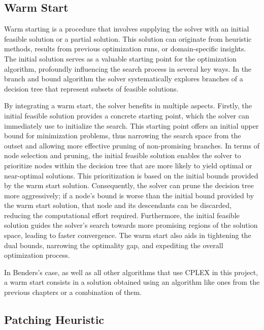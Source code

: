 \subsection{Warm Start}

Warm starting is a procedure that involves supplying the solver with an initial feasible solution or a partial solution.
This solution can originate from heuristic methods, results from previous optimization runs, or domain-specific insights.
The initial solution serves as a valuable starting point for the optimization algorithm, profoundly influencing the search process in several key ways.
In the branch and bound algorithm the solver systematically explores branches of a decision tree that represent subsets of feasible solutions.

By integrating a warm start, the solver benefits in multiple aspects. Firstly, the initial feasible solution provides a concrete starting point, which the solver can immediately use to initialize the search.
This starting point offers an initial upper bound for minimization problems, thus narrowing the search space from the outset and allowing more effective pruning of non-promising branches.
In terms of node selection and pruning, the initial feasible solution enables the solver to prioritize nodes within the decision tree that are more likely to yield optimal or near-optimal solutions.
This prioritization is based on the initial bounds provided by the warm start solution.
Consequently, the solver can prune the decision tree more aggressively; if a node's bound is worse than the initial bound provided by the warm start solution, that node and its descendants can be discarded, reducing the computational effort required.
Furthermore, the initial feasible solution guides the solver's search towards more promising regions of the solution space, leading to faster convergence.
The warm start also aids in tightening the dual bounds, narrowing the optimality gap, and expediting the overall optimization process.

In Benders's case, as well as all other algorithms that use CPLEX in this project, a warm start consists in a solution obtained using an algorithm like ones from the previous chapters or a combination of them.

\subsection{Patching Heuristic}

